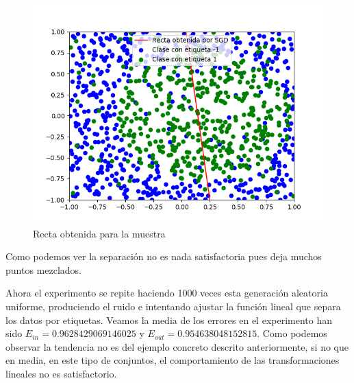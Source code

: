\documentclass[12pt,a4paper]{article}
\begin{document}
\begin{figure}[H]
	\centering
	\includegraphics[scale=0.8]{./Imagenes/ej2-2-4.png}
	\caption{Recta obtenida para la muestra}
	\label{ej2-2-4}
\end{figure}

Como podemos ver la separación no es nada satisfactoria pues deja muchos puntos mezclados.

Ahora el experimento se repite haciendo 1000 veces esta generación aleatoria uniforme, produciendo el ruido e intentando ajustar la función lineal que separa los datos por etiquetas. Veamos la media de los errores en el experimento han sido $E_{in} = 0.9628429069146025$ y $E_{out} = 0.954638048152815$. Como podemos observar la tendencia no es del ejemplo concreto descrito anteriormente, si no que en media, en este tipo de conjuntos, el comportamiento de las transformaciones lineales no es satisfactorio.
\end{document}

